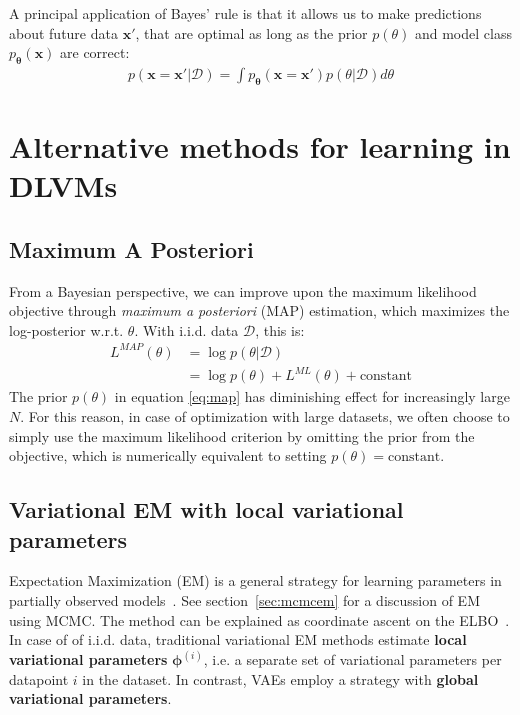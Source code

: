 \documentclass[MAL,biber]{nowfnt} %
\newcommand{\bb}[1]{\mathbf{#1}}
\newcommand{\bx}{\bb{x}}
\newcommand{\bT}{\boldsymbol{\theta}}
\newcommand{\bphi}{\boldsymbol{\phi}}
\newcommand{\pT}{p_{\bT}}
\begin{document}
A principal application of Bayes' rule is that it allows us to make predictions about future data $\bx'$, that are optimal as long as the prior $p(\theta)$ and model class $\pT(\bx)$ are correct:
\begin{align*}
p(\bx=\bx'|\mathcal{D}) = \int \pT(\bx=\bx') p(\theta | \mathcal{D}) d \theta 
\end{align*}

\section{Alternative methods for learning in DLVMs}
\label{sec:altneratives}

\subsection{Maximum A Posteriori}
\label{sec:map}
From a Bayesian perspective, we can improve upon the maximum likelihood objective through \emph{maximum a posteriori} (MAP) estimation, which maximizes the log-posterior w.r.t. $\theta$. With i.i.d. data $\mathcal{D}$, this is:
\begin{align}
L^{MAP}(\theta)
&= \log p(\theta|\mathcal{D})\\
&= \log p(\theta) + L^{ML}(\theta)+ \text{constant}
\label{eq:map}\end{align}
The prior $p(\theta)$ in equation \eqref{eq:map} has diminishing effect for increasingly large $N$. For this reason, in case of optimization with large datasets, we often choose to simply use the maximum likelihood criterion by omitting the prior from the objective, which is numerically equivalent to setting $p(\theta) = \text{constant}$.

\subsection{Variational EM with local variational parameters}

Expectation Maximization (EM) is a general strategy for learning parameters in partially observed models~\citep{dempster1977em}. See section~\ref{sec:mcmcem} for a discussion of EM using MCMC. The method can be explained as coordinate ascent on the ELBO~\citep{neal1998em}. In case of of i.i.d. data, traditional variational EM methods estimate \textbf{local variational parameters} $\bphi^{(i)}$, i.e. a separate set of variational parameters per datapoint $i$ in the dataset. In contrast, VAEs employ a strategy with \textbf{global variational parameters}.
\end{document}
